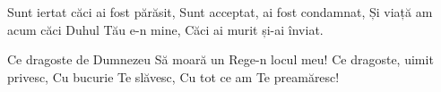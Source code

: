 \beginverse
Sunt iertat căci ai fost părăsit,
Sunt acceptat, ai fost condamnat,
Și viață am acum căci Duhul Tău e-n mine,
Căci ai murit și-ai înviat.
\endverse

\beginchorus
Ce dragoste de Dumnezeu
Să moară un Rege-n locul meu!
Ce dragoste, uimit privesc,
Cu bucurie Te slăvesc,
Cu tot ce am Te preamăresc!
\endchorus
\endsong